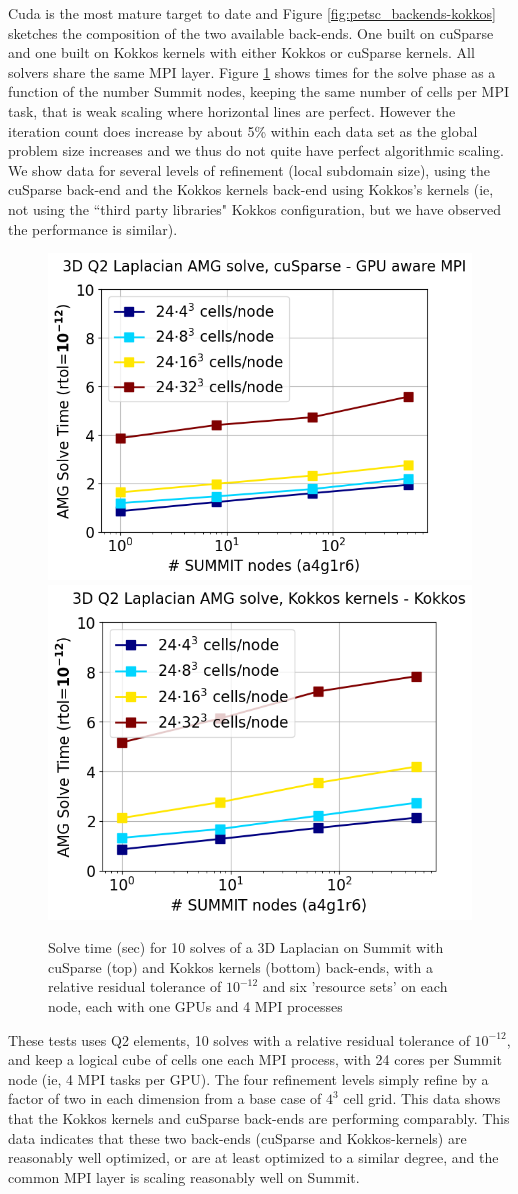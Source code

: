 \documentclass[5p,times]{elsarticle}
\begin{document}
Cuda is the most mature target to date and Figure \ref{fig:petsc_backends-kokkos} sketches the composition of the two available back-ends.
One built on cuSparse and one built on Kokkos kernels with either Kokkos or cuSparse kernels.
All solvers share the same MPI layer.
Figure \ref{fig:gamg_weak_scaling} shows times for the solve phase as a function of the number Summit nodes, keeping the same number of cells per MPI task, that is weak scaling where  horizontal lines are perfect.
However the iteration count does increase by about 5\% within each data set as the global problem size increases and we thus do not quite have perfect algorithmic scaling.
We show data for several levels of refinement (local subdomain size), using the cuSparse back-end and the Kokkos kernels back-end using Kokkos's kernels (ie, not using the ``third party libraries" Kokkos configuration, but we have observed the performance is similar).
\begin{figure}[htbp]
\begin{center}
\includegraphics[width=.49\linewidth]{weak_scaling_cuda_def_a4g1r6.png}
\includegraphics[width=.49\linewidth]{weak_scaling_kokkos_notpl_a4g1r6.png}
\caption{Solve time (sec) for 10 solves of a 3D Laplacian on Summit with cuSparse (top) and Kokkos kernels (bottom) back-ends, with a relative residual tolerance of $10^{-12}$ and six  'resource sets' on each node, each with one GPUs and 4 MPI processes}
\label{fig:gamg_weak_scaling}
\end{center}
\end{figure}

These tests uses Q2 elements, 10 solves with a relative residual tolerance of $10^{-12}$, and keep a logical cube of cells one each MPI process, with 24 cores per Summit node (ie, 4 MPI tasks per GPU).
The four refinement levels simply refine by a factor of two in each dimension from a base case of $4^3$ cell grid.
This data shows that the Kokkos kernels and cuSparse back-ends are performing comparably.
This data indicates that these two back-ends (cuSparse and Kokkos-kernels) are reasonably well optimized, or are at least optimized to a similar degree, and the common MPI layer is scaling reasonably well on Summit.

%
\end{document}
